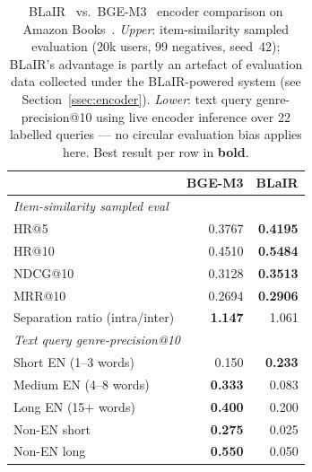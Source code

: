 \begin{table}[tbp]
\caption{BLaIR~\cite{hou2024amazon} vs.\ BGE-M3~\cite{chen2024bgem3} encoder comparison on Amazon Books~\cite{hou2024amazon}.
  \emph{Upper}: item-similarity sampled evaluation (20k users, 99 negatives,
  seed~42); BLaIR's advantage is partly an artefact of evaluation data
  collected under the BLaIR-powered system (see Section~\ref{ssec:encoder}).
  \emph{Lower}: text query genre-precision@10 using live encoder inference
  over 22 labelled queries — no circular evaluation bias applies here.
  Best result per row in \textbf{bold}.}
\label{tab:encoder_comparison}
\centering
\small
\begin{tabular}{lrr}
\toprule
 & \textbf{BGE-M3} & \textbf{BLaIR} \\
\midrule
\multicolumn{3}{l}{\emph{Item-similarity sampled eval}} \\[2pt]
\quad HR@5      & 0.3767 & \textbf{0.4195} \\
\quad HR@10     & 0.4510 & \textbf{0.5484} \\
\quad NDCG@10   & 0.3128 & \textbf{0.3513} \\
\quad MRR@10    & 0.2694 & \textbf{0.2906} \\
\quad Separation ratio (intra/inter) & \textbf{1.147} & 1.061 \\
\midrule
\multicolumn{3}{l}{\emph{Text query genre-precision@10}} \\[2pt]
\quad Short EN (1--3 words)  & 0.150          & \textbf{0.233} \\
\quad Medium EN (4--8 words) & \textbf{0.333} & 0.083          \\
\quad Long EN (15+ words)    & \textbf{0.400} & 0.200          \\
\quad Non-EN short       & \textbf{0.275} & 0.025          \\
\quad Non-EN long        & \textbf{0.550} & 0.050          \\
\bottomrule
\end{tabular}
\end{table}
